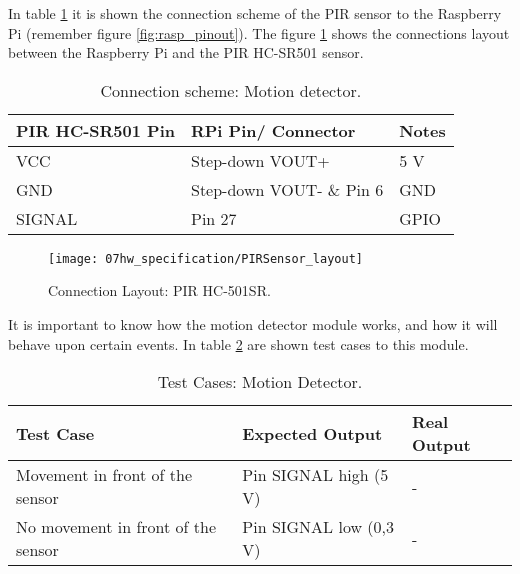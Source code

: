 
In table \ref{table:connect_pir} it is shown the connection scheme of the PIR sensor to the Raspberry Pi (remember figure \ref{fig:rasp_pinout}). The figure \ref{fig:PirLayout} shows the connections layout between the Raspberry Pi and the PIR HC-SR501 sensor.

\begin{table}[H]
	\centering
	\begin{tabular}{|m{4cm}|m{5cm}|m{3cm}|}
		\hline
		\textbf{PIR HC-SR501 Pin} & \textbf{RPi Pin/ Connector} & \textbf{Notes} 
		\\\hline\hline
		VCC & Step-down VOUT+ & 5 V
		\\\hline
		GND & Step-down VOUT- \& Pin 6 & GND
		\\\hline
		SIGNAL & Pin 27 & GPIO
		\\\hline
	\end{tabular}
	
	\caption{Connection scheme: Motion detector.}
	\label{table:connect_pir}
\end{table}

\begin{figure}[H]
	\centering
	\texttt{[image: 07hw\_specification/PIRSensor\_layout]}
	\caption{Connection Layout: PIR HC-501SR.}
	\label{fig:PirLayout}
\end{figure}



It is important to know how the motion detector module works, and how it will behave upon certain events. In table \ref{table:test_pir} are shown test cases to this module.

\begin{table}[H]
	\centering
	\resizebox{\columnwidth}{!}
	{
		\begin{tabular}{|m{3cm}|m{5cm}||m{5cm}|}
			\hline
			\textbf{Test Case} & \textbf{Expected Output} & \textbf{Real Output}
			\\\hline\hline
			Movement in front of the sensor & Pin SIGNAL high (5 V) & -
			\\\hline
			No movement in front of the sensor & Pin SIGNAL low (0,3 V) & -
			\\\hline
		\end{tabular}
	}
	\caption{Test Cases: Motion Detector.}
	\label{table:test_pir}
\end{table}

\clearpage
